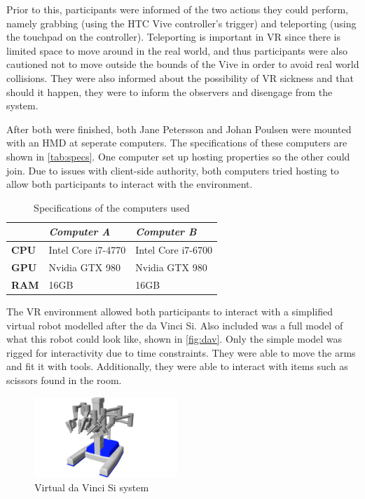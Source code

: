 \documentclass[conference]{IEEEtran}
\begin{document}
Prior to this, participants were informed of the two actions they could perform, namely grabbing (using the HTC Vive controller's trigger) and teleporting (using the touchpad on the controller). Teleporting is important in VR since there is limited space to move around in the real world, and thus participants were also cautioned not to move outside the bounds of the Vive in order to avoid real world collisions. They were also informed about the possibility of VR sickness and that should it happen, they were to inform the observers and disengage from the system\citep{barrett_side_2004}.

After both were finished, both Jane Petersson and Johan Poulsen were mounted with an HMD at seperate computers. The specifications of these computers are shown in \autoref{tab:specs}. One computer set up hosting properties so the other could join. Due to issues with client-side authority, both computers tried hosting to allow both participants to interact with the environment.

\begin{table}
\centering
\begin{tabularx}{0.48\textwidth}{X X X}
\toprule
                     & \textit{Computer A} & \textit{Computer B} \\ \midrule \rowcolor{lightGrey}
\textbf{CPU}         & Intel Core i7-4770  & Intel Core i7-6700  \\

\textbf{GPU}         & Nvidia GTX 980      & Nvidia GTX 980    \\  \rowcolor{lightGrey}

\textbf{RAM} 		 & 16GB                & 16GB                 \\ \toprule
\end{tabularx}
\caption{Specifications of the computers used}
\label{tab:specs}
\end{table}

The VR environment allowed both participants to interact with a simplified virtual robot modelled after the da Vinci Si. Also included was a full model of what this robot could look like, shown in \autoref{fig:dav}. Only the simple model was rigged for interactivity due to time constraints. They were able to move the arms and fit it with tools. Additionally, they were able to interact with items such as scissors found in the room.

\begin{figure}
\centering
\includegraphics[width=0.48\textwidth]{Figures/TempRender.png}
\caption{Virtual da Vinci Si system}
\label{fig:dav}
\end{figure}
\end{document}
